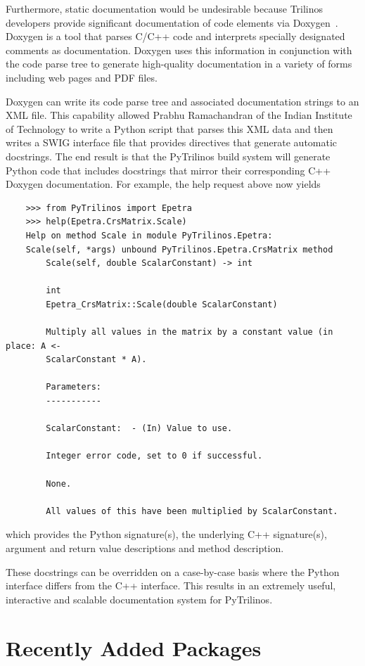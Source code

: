 \documentclass[11pt]{article}
\begin{document}
Furthermore, static documentation would be undesirable because Trilinos developers provide significant documentation of code elements via Doxygen~\cite{Doxygen}.  Doxygen is a tool that parses C/C++ code and interprets specially designated comments as documentation.  Doxygen uses this information in conjunction with the code parse tree to generate high-quality documentation in a variety of forms including web pages and PDF files.

Doxygen can write its code parse tree and associated documentation strings to an XML file.  This capability allowed Prabhu Ramachandran of the Indian Institute of Technology to write a Python script that parses this XML data and then writes a SWIG interface file that provides directives that generate automatic docstrings.  The end result is that the PyTrilinos build system will generate Python code that includes docstrings that mirror their corresponding C++ Doxygen documentation.  For example, the help request above now yields

\begin{verbatim}
    >>> from PyTrilinos import Epetra
    >>> help(Epetra.CrsMatrix.Scale)
    Help on method Scale in module PyTrilinos.Epetra:
    Scale(self, *args) unbound PyTrilinos.Epetra.CrsMatrix method
        Scale(self, double ScalarConstant) -> int

        int
        Epetra_CrsMatrix::Scale(double ScalarConstant)

        Multiply all values in the matrix by a constant value (in place: A <-
        ScalarConstant * A).

        Parameters:
        -----------

        ScalarConstant:  - (In) Value to use.

        Integer error code, set to 0 if successful.

        None.

        All values of this have been multiplied by ScalarConstant.
\end{verbatim}

which provides the Python signature(s), the underlying C++ signature(s), argument and return value descriptions and method description.

These docstrings can be overridden on a case-by-case basis where the Python interface differs from the C++ interface.  This results in an extremely useful, interactive and scalable documentation system for PyTrilinos.

\section{Recently Added Packages}
\label{sec:newpackages}
\end{document}
